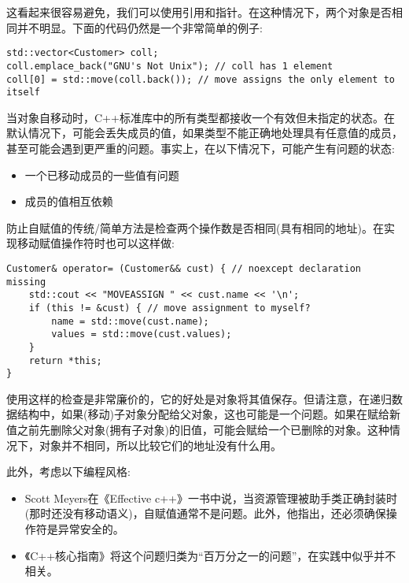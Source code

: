 这看起来很容易避免，我们可以使用引用和指针。在这种情况下，两个对象是否相同并不明显。下面的代码仍然是一个非常简单的例子:\par

\begin{lstlisting}[caption={}]
std::vector<Customer> coll;
coll.emplace_back("GNU's Not Unix"); // coll has 1 element
coll[0] = std::move(coll.back()); // move assigns the only element to itself
\end{lstlisting}

当对象自移动时，C++标准库中的所有类型都接收一个有效但未指定的状态。在默认情况下，可能会丢失成员的值，如果类型不能正确地处理具有任意值的成员，甚至可能会遇到更严重的问题。事实上，在以下情况下，可能产生有问题的状态:\par

\begin{itemize}
	\item 一个已移动成员的一些值有问题
	\item 成员的值相互依赖
\end{itemize}

防止自赋值的传统/简单方法是检查两个操作数是否相同(具有相同的地址)。在实现移动赋值操作符时也可以这样做:\par

\begin{lstlisting}[caption={}]
Customer& operator= (Customer&& cust) { // noexcept declaration missing
	std::cout << "MOVEASSIGN " << cust.name << '\n';
	if (this != &cust) { // move assignment to myself?
		name = std::move(cust.name);
		values = std::move(cust.values);
	}
	return *this;
}
\end{lstlisting}

使用这样的检查是非常廉价的，它的好处是对象将其值保存。但请注意，在递归数据结构中，如果(移动)子对象分配给父对象，这也可能是一个问题。如果在赋给新值之前先删除父对象(拥有子对象)的旧值，可能会赋给一个已删除的对象。这种情况下，对象并不相同，所以比较它们的地址没有什么用。\par

此外，考虑以下编程风格:\par

\begin{itemize}
	\item Scott Meyers在《Effective c++》一书中说，当资源管理被助手类正确封装时(那时还没有移动语义)，自赋值通常不是问题。此外，他指出，还必须确保操作符是异常安全的。
	\item 《C++核心指南》将这个问题归类为“百万分之一的问题”，在实践中似乎并不相关。
\end{itemize}


